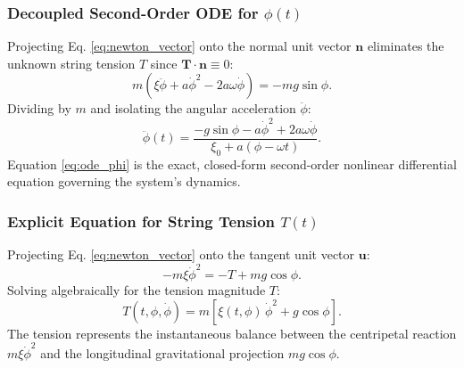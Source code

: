 \documentclass[11pt,a4paper]{article}
\begin{document}
\subsubsection{Decoupled Second-Order ODE for $\phi(t)$}
Projecting Eq. \eqref{eq:newton_vector} onto the normal unit vector $\mathbf{n}$ eliminates the unknown string tension $T$ since $\mathbf{T} \cdot \mathbf{n} \equiv 0$:
\begin{equation}
    m\left(\xi\ddot{\phi} + a\dot{\phi}^2 - 2a\omega\dot{\phi}\right) = -m g\sin\phi.
\end{equation}
Dividing by $m$ and isolating the angular acceleration $\ddot{\phi}$:
\begin{equation}
    \label{eq:ode_phi}
    \ddot{\phi}(t) = \frac{-g\sin\phi - a\dot{\phi}^2 + 2a\omega\dot{\phi}}{\xi_0 + a(\phi - \omega t)}.
\end{equation}
Equation \eqref{eq:ode_phi} is the exact, closed-form second-order nonlinear differential equation governing the system's dynamics.

\subsubsection{Explicit Equation for String Tension $T(t)$}
Projecting Eq. \eqref{eq:newton_vector} onto the tangent unit vector $\mathbf{u}$:
\begin{equation}
    -m\xi\dot{\phi}^2 = -T + m g\cos\phi.
\end{equation}
Solving algebraically for the tension magnitude $T$:
\begin{equation}
    \label{eq:tension_formula}
    T(t, \phi, \dot{\phi}) = m\left[\xi(t, \phi)\,\dot{\phi}^2 + g\cos\phi\right].
\end{equation}
The tension represents the instantaneous balance between the centripetal reaction $m\xi\dot{\phi}^2$ and the longitudinal gravitational projection $m g\cos\phi$.
\end{document}
